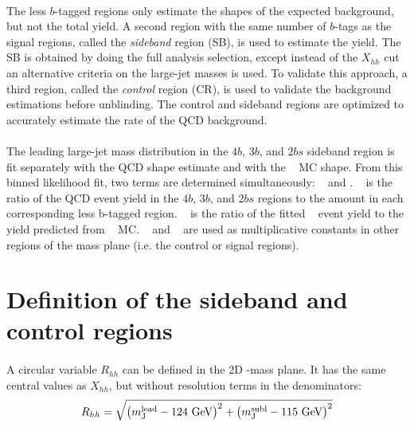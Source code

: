 \paragraph{}
The less $b$-tagged regions only estimate the shapes of the expected background, but not the total yield.
A second region with the same number of $b$-tags as the signal regions, called the \textit{sideband} region (SB), is used to estimate the yield.
The SB is obtained by doing the full analysis selection, except instead of the $X_{hh}$ cut an alternative criteria on the large-\R jet masses is used.
To validate this approach, a third region, called the \textit{control} region (CR), is used to validate the background estimations before unblinding. 
The control and sideband regions are optimized to accurately estimate the rate of the QCD background. 

\paragraph{}
The leading large-\R jet mass distribution in the $4b$, $3b$, and $2bs$ sideband region is fit separately with the QCD shape estimate and with the \ttbar~ MC shape. 
From this binned likelihood fit, two terms are determined simultaneously: \muqcd~ and \alphatt. 
\muqcd~ is the ratio of the QCD event yield in the $4b$, $3b$, and $2bs$ regions to the amount in each corresponding less b-tagged region.
\alphatt~ is the ratio of the fitted \ttbar~ event yield to the yield predicted from \ttbar~ MC.
\muqcd~ and \alphatt~ are used as multiplicative constants in other regions of the mass plane (i.e. the control or signal regions).



\section{Definition of the sideband and control regions}
\label{sec:boosted-SBCR}

\paragraph{}
A circular variable $R_{hh}$ can be defined in the 2D \mleadJ-\msublJ mass plane. 
It has the same central values as $X_{hh}$, but without resolution terms in the denominators:
\begin{equation}
\label{eq:boosted_RhhDef}
R_{hh} = \sqrt{\left(m^{\rm lead}_{\rm J} - \text{124 GeV}\right)^2 + \left(m^{\rm subl}_{\rm J} - \text{115 GeV}\right)^2}
\end{equation}

